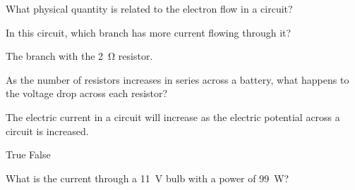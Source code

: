 \documentclass[answers]{exam}
\begin{document}
\begin{questions}
\question
What physical quantity is related to the electron flow in a circuit? \fillin[current]


\question
In this circuit, which branch has more current flowing through it?

\ifprintanswers
{\color{red}
The branch with the \SI{2}{\ohm} resistor.
}
\else
\fillwithlines{1cm}
\fi

\begin{center}
\end{center}


\question
As the number of resistors increases in series across a battery, what happens to the voltage drop across each resistor?



\question
The electric current in a circuit will increase as the electric potential across a circuit is increased.

\begin{randomizechoices}[norandomize]
    \correctchoice True 
    \choice False
\end{randomizechoices}

\question
What is the current through a \SI{11}{V} bulb with a power of \SI{99}{W}? \fillin[\SI{9.0}{A}]


\end{questions}
\end{document}
